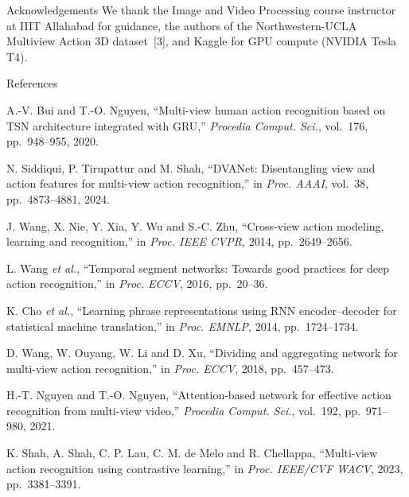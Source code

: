 \documentclass{article}
\newcommand\smalltext{\fontsize{15}{18.5}\selectfont}
\begin{document}
\begin{tcbraster}[raster columns=2,raster equal height=rows,raster column skip=8mm,raster after skip=0mm,raster force size=false]
\begin{psec}[after skip=0pt,width=0.29\linewidth,fontupper=\smalltext]{Acknowledgements}
We thank the Image and Video Processing course instructor at IIIT Allahabad for guidance, the authors of the Northwestern-UCLA Multiview Action 3D dataset~[3], and Kaggle for GPU compute (NVIDIA Tesla T4).
\end{psec}
\begin{psec}[after skip=0pt,width=0.695\linewidth,fontupper=\fontsize{12}{14.2}\selectfont,top=3mm,bottom=3mm]{References}
\begin{enumerate}[label={[\arabic*]},leftmargin=2.1em,itemsep=0pt,topsep=0pt]
\item A.-V. Bui and T.-O. Nguyen, ``Multi-view human action recognition based on TSN architecture integrated with GRU,'' \textit{Procedia Comput. Sci.}, vol.~176, pp.~948--955, 2020.
\item N. Siddiqui, P. Tirupattur and M. Shah, ``DVANet: Disentangling view and action features for multi-view action recognition,'' in \textit{Proc. AAAI}, vol.~38, pp.~4873--4881, 2024.
\item J. Wang, X. Nie, Y. Xia, Y. Wu and S.-C. Zhu, ``Cross-view action modeling, learning and recognition,'' in \textit{Proc. IEEE CVPR}, 2014, pp.~2649--2656.
\item L. Wang \textit{et al.}, ``Temporal segment networks: Towards good practices for deep action recognition,'' in \textit{Proc. ECCV}, 2016, pp.~20--36.
\item K. Cho \textit{et al.}, ``Learning phrase representations using RNN encoder--decoder for statistical machine translation,'' in \textit{Proc. EMNLP}, 2014, pp.~1724--1734.
\item D. Wang, W. Ouyang, W. Li and D. Xu, ``Dividing and aggregating network for multi-view action recognition,'' in \textit{Proc. ECCV}, 2018, pp.~457--473.
\item H.-T. Nguyen and T.-O. Nguyen, ``Attention-based network for effective action recognition from multi-view video,'' \textit{Procedia Comput. Sci.}, vol.~192, pp.~971--980, 2021.
\item K. Shah, A. Shah, C. P. Lau, C. M. de Melo and R. Chellappa, ``Multi-view action recognition using contrastive learning,'' in \textit{Proc. IEEE/CVF WACV}, 2023, pp.~3381--3391.

\end{enumerate}
\end{psec}
\end{tcbraster}
\end{document}

